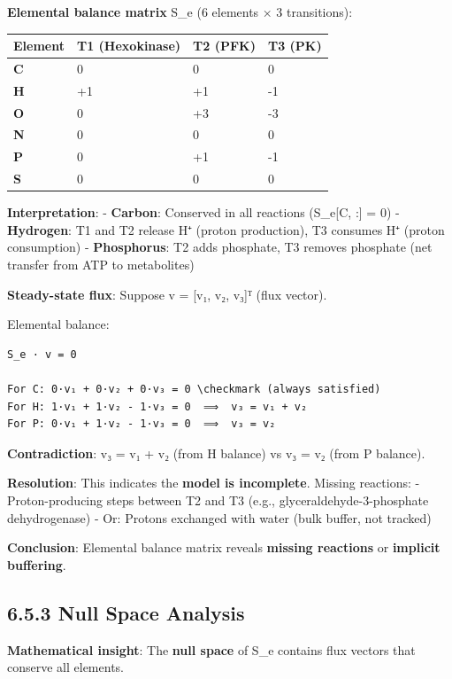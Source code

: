 \textbf{Elemental balance matrix} S\_e (6 elements × 3 transitions):

\begin{longtable}[]{@{}llll@{}}
\toprule\noalign{}
Element & T1 (Hexokinase) & T2 (PFK) & T3 (PK) \\
\midrule\noalign{}
\endhead
\bottomrule\noalign{}
\endlastfoot
\textbf{C} & 0 & 0 & 0 \\
\textbf{H} & +1 & +1 & -1 \\
\textbf{O} & 0 & +3 & -3 \\
\textbf{N} & 0 & 0 & 0 \\
\textbf{P} & 0 & +1 & -1 \\
\textbf{S} & 0 & 0 & 0 \\
\end{longtable}

\textbf{Interpretation}: - \textbf{Carbon}: Conserved in all reactions
(S\_e{[}C, :{]} = 0) - \textbf{Hydrogen}: T1 and T2 release H⁺ (proton
production), T3 consumes H⁺ (proton consumption) - \textbf{Phosphorus}:
T2 adds phosphate, T3 removes phosphate (net transfer from ATP to
metabolites)

\textbf{Steady-state flux}: Suppose v = {[}v₁, v₂, v₃{]}ᵀ (flux vector).

Elemental balance:

\begin{lstlisting}
S_e · v = 0

For C: 0·v₁ + 0·v₂ + 0·v₃ = 0 \checkmark (always satisfied)
For H: 1·v₁ + 1·v₂ - 1·v₃ = 0  ⟹  v₃ = v₁ + v₂
For P: 0·v₁ + 1·v₂ - 1·v₃ = 0  ⟹  v₃ = v₂
\end{lstlisting}

\textbf{Contradiction}: v₃ = v₁ + v₂ (from H balance) vs v₃ = v₂ (from P
balance).

\textbf{Resolution}: This indicates the \textbf{model is incomplete}.
Missing reactions: - Proton-producing steps between T2 and T3 (e.g.,
glyceraldehyde-3-phosphate dehydrogenase) - Or: Protons exchanged with
water (bulk buffer, not tracked)

\textbf{Conclusion}: Elemental balance matrix reveals \textbf{missing
reactions} or \textbf{implicit buffering}.

\hypertarget{null-space-analysis}{%
\subsection{6.5.3 Null Space Analysis}\label{null-space-analysis}}

\textbf{Mathematical insight}: The \textbf{null space} of S\_e contains
flux vectors that conserve all elements.

